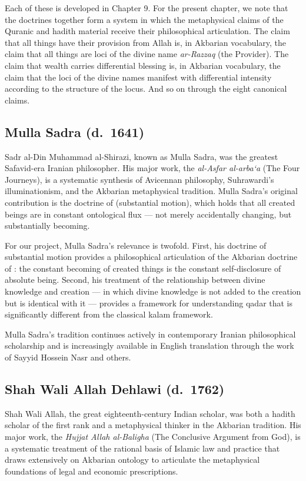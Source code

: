 Each of these is developed in Chapter 9. For the present chapter, we
note that the doctrines together form a system in which the
metaphysical claims of the Quranic and hadith material receive their
philosophical articulation. The claim that all things have their
provision from Allah is, in Akbarian vocabulary, the claim that all
things are loci of the divine name \textit{ar-Razzaq} (the
Provider). The claim that wealth carries differential blessing is,
in Akbarian vocabulary, the claim that the loci of the divine names
manifest with differential intensity according to the structure of
the locus. And so on through the eight canonical claims.

\subsection{Mulla Sadra (d.~1641)}

Sadr al-Din Muhammad al-Shirazi, known as Mulla Sadra, was the
greatest Safavid-era Iranian philosopher. His major work, the
\textit{al-Asfar al-arba`a} (The Four Journeys), is a systematic
synthesis of Avicennan philosophy, Suhrawardi's illuminationism, and
the Akbarian metaphysical tradition. Mulla Sadra's original
contribution is the doctrine of 
(substantial motion), which holds that all created beings are in
constant ontological flux --- not merely accidentally changing, but
substantially becoming.

For our project, Mulla Sadra's relevance is twofold. First, his
doctrine of substantial motion provides a philosophical articulation
of the Akbarian doctrine of : the constant becoming
of created things is the constant self-disclosure of absolute being.
Second, his treatment of the relationship between divine knowledge
and creation --- in which divine knowledge is not added to the
creation but is identical with it --- provides a framework for
understanding qadar that is significantly different from the
classical kalam framework.

Mulla Sadra's tradition continues actively in contemporary Iranian
philosophical scholarship and is increasingly available in English
translation through the work of Sayyid Hossein Nasr and others.

\subsection{Shah Wali Allah Dehlawi (d.~1762)}

Shah Wali Allah, the great eighteenth-century Indian scholar, was
both a hadith scholar of the first rank and a metaphysical thinker
in the Akbarian tradition. His major work, the
\textit{Hujjat Allah al-Baligha} (The Conclusive Argument from God),
is a systematic treatment of the rational basis of Islamic law and
practice that draws extensively on Akbarian ontology to articulate
the metaphysical foundations of legal and economic prescriptions.

